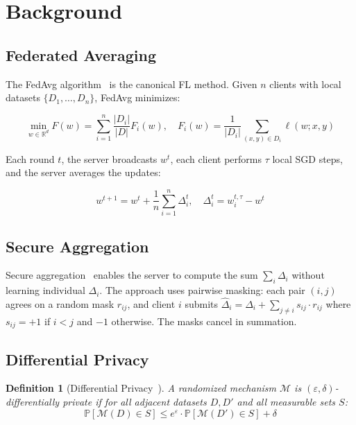 \documentclass[11pt,a4paper]{article}
\newcommand{\RR}{\mathbb{R}}
\newcommand{\PP}{\mathbb{P}}
\newtheorem{definition}{Definition}
\begin{document}
\section{Background}

\subsection{Federated Averaging}

The FedAvg algorithm~\citep{mcmahan2017communication} is the canonical FL method. Given $n$ clients with local datasets $\{D_1, \ldots, D_n\}$, FedAvg minimizes:

\begin{equation}
    \min_{w \in \RR^d} F(w) = \sum_{i=1}^{n} \frac{|D_i|}{|D|} F_i(w), \quad F_i(w) = \frac{1}{|D_i|} \sum_{(x,y) \in D_i} \ell(w; x, y)
\end{equation}

Each round $t$, the server broadcasts $w^t$, each client performs $\tau$ local SGD steps, and the server averages the updates:

\begin{equation}
    w^{t+1} = w^t + \frac{1}{n} \sum_{i=1}^{n} \Delta_i^t, \quad \Delta_i^t = w_i^{t,\tau} - w^t
\end{equation}

\subsection{Secure Aggregation}

Secure aggregation~\citep{bonawitz2017practical} enables the server to compute the sum $\sum_i \Delta_i$ without learning individual $\Delta_i$. The approach uses pairwise masking: each pair $(i, j)$ agrees on a random mask $r_{ij}$, and client $i$ submits $\hat{\Delta}_i = \Delta_i + \sum_{j \neq i} s_{ij} \cdot r_{ij}$ where $s_{ij} = +1$ if $i < j$ and $-1$ otherwise. The masks cancel in summation.

\subsection{Differential Privacy}

\begin{definition}[Differential Privacy~\citep{dwork2006calibrating}]
A randomized mechanism $\mathcal{M}$ is $(\varepsilon, \delta)$-differentially private if for all adjacent datasets $D, D'$ and all measurable sets $S$:
\begin{equation}
    \PP[\mathcal{M}(D) \in S] \leq e^\varepsilon \cdot \PP[\mathcal{M}(D') \in S] + \delta
\end{equation}
\end{definition}
\end{document}

